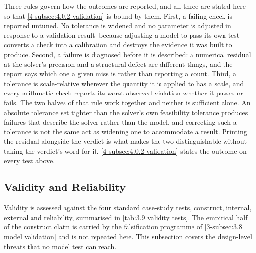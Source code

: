 Three rules govern how the outcomes are reported, and all three are stated here so that \autoref{4-subsec:4.0.2 validation} is bound by them. First, a failing check is reported untuned. No tolerance is widened and no parameter is adjusted in response to a validation result, because adjusting a model to pass its own test converts a check into a calibration and destroys the evidence it was built to produce. Second, a failure is diagnosed before it is described: a numerical residual at the solver's precision and a structural defect are different things, and the report says which one a given miss is rather than reporting a count. Third, a tolerance is scale-relative wherever the quantity it is applied to has a scale, and every arithmetic check reports its worst observed violation whether it passes or fails. The two halves of that rule work together and neither is sufficient alone. An absolute tolerance set tighter than the solver's own feasibility tolerance produces failures that describe the solver rather than the model, and correcting such a tolerance is not the same act as widening one to accommodate a result. Printing the residual alongside the verdict is what makes the two distinguishable without taking the verdict's word for it. \autoref{4-subsec:4.0.2 validation} states the outcome on every test above.

\subsection{Validity and Reliability}
\label{3-subsec:3.9 validity}

Validity is assessed against the four standard case-study tests, construct, internal, external and reliability, summarised in \autoref{tab:3.9 validity tests}. The empirical half of the construct claim is carried by the falsification programme of \autoref{3-subsec:3.8 model validation} and is not repeated here. This subsection covers the design-level threats that no model test can reach.

